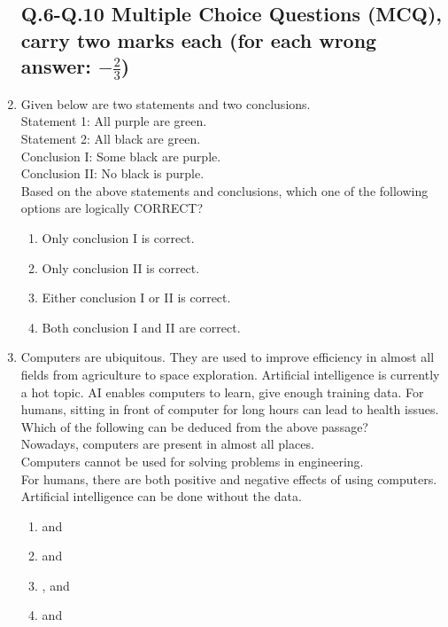 \documentclass[journal,12pt,onecolumn]{IEEEtran}
\theoremstyle{remark}
\begin{document}
\begin{enumerate}
\subsection*{\textbf{Q.6-Q.10 Multiple Choice Questions (MCQ), carry two marks each (for each wrong answer: \(-\frac{2}{3}\))}}
\item Given below are two statements and two conclusions.\\
 Statement 1: \;All purple are green.\\
 Statement 2: \;All black are green.\\
 Conclusion I: \;Some black are purple.\\
 Conclusion II: \;No black is purple.\\
 Based on the above statements and conclusions, which one of the following options are logically CORRECT?
\begin{enumerate}
    \item Only conclusion I is correct.
    \item Only conclusion II is correct.
    \item Either conclusion I or II is correct.
    \item Both conclusion I and II are correct.
\end{enumerate}
\item Computers are ubiquitous. They are used to improve efficiency in almost all fields from agriculture to space exploration. Artificial intelligence  is currently a hot topic. AI enables computers to learn, give enough training data. For humans, sitting in front of computer for long hours can lead to health issues.\\ Which of the following can be deduced from the above passage?\\
\;Nowadays, computers are present in almost all places.\\
\;Computers cannot be used for solving problems in engineering.\\
\;For humans, there are both positive and negative effects of using computers.\\
\;Artificial intelligence can be done without the data.
\begin{enumerate}
    \item {} and 
    \item {} and 
    \item {},  and 
    \item {} and 

\end{enumerate}
\end{enumerate}
\end{document}
